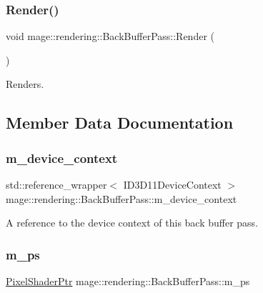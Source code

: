 \subsubsection{\texorpdfstring{Render()}{Render()}}
{\footnotesize\ttfamily void mage\+::rendering\+::\+Back\+Buffer\+Pass\+::\+Render (\begin{DoxyParamCaption}{ }\end{DoxyParamCaption})}

Renders. 

\subsection{Member Data Documentation}
\hypertarget{classmage_1_1rendering_1_1_back_buffer_pass_ae87c0cf8b2ffe627ac44faaf61791b4f}{}\label{classmage_1_1rendering_1_1_back_buffer_pass_ae87c0cf8b2ffe627ac44faaf61791b4f} 
\subsubsection{\texorpdfstring{m\+\_\+device\+\_\+context}{m\_device\_context}}
{\footnotesize\ttfamily std\+::reference\+\_\+wrapper$<$ I\+D3\+D11\+Device\+Context $>$ mage\+::rendering\+::\+Back\+Buffer\+Pass\+::m\+\_\+device\+\_\+context\hspace{0.3cm}{\ttfamily [private]}}

A reference to the device context of this back buffer pass. \hypertarget{classmage_1_1rendering_1_1_back_buffer_pass_a46bc7e8b3636db2eb84b42590b7bd51e}{}\label{classmage_1_1rendering_1_1_back_buffer_pass_a46bc7e8b3636db2eb84b42590b7bd51e} 
\subsubsection{\texorpdfstring{m\+\_\+ps}{m\_ps}}
{\footnotesize\ttfamily \hyperlink{namespacemage_1_1rendering_af03d922b228ee9c8542baaa2ecc9f259}{Pixel\+Shader\+Ptr} mage\+::rendering\+::\+Back\+Buffer\+Pass\+::m\+\_\+ps\hspace{0.3cm}{\ttfamily [private]}}

